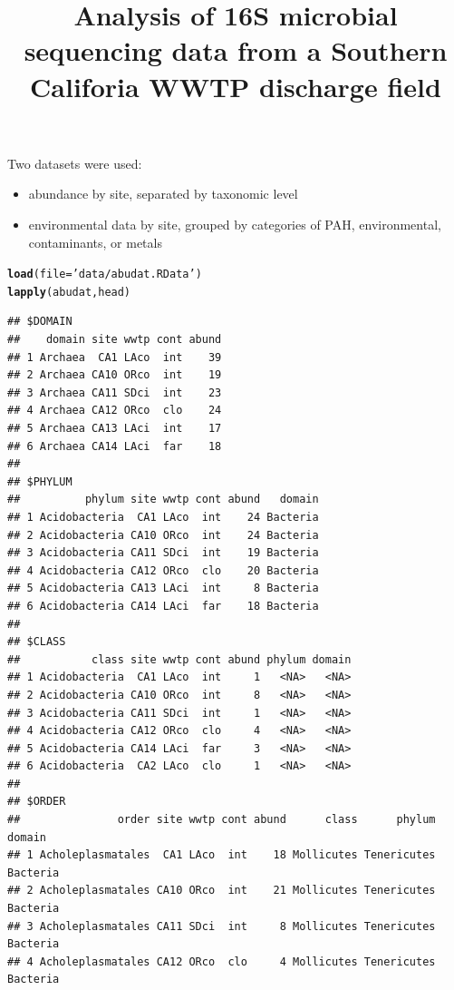 \documentclass[letterpaper,12pt]{article}\usepackage[]{graphicx}\usepackage[]{color}
\makeatletter
\newcommand{\hlstr}[1]{\textcolor[rgb]{0.192,0.494,0.8}{#1}}%
\newcommand{\hlstd}[1]{\textcolor[rgb]{0.345,0.345,0.345}{#1}}%
\newcommand{\hlkwc}[1]{\textcolor[rgb]{0.333,0.667,0.333}{#1}}%
\newcommand{\hlkwd}[1]{\textcolor[rgb]{0.737,0.353,0.396}{\textbf{#1}}}%
\newenvironment{kframe}{%
 \def\at@end@of@kframe{}%
 \ifinner\ifhmode%
  \def\at@end@of@kframe{\end{minipage}}%
  \begin{minipage}{\columnwidth}%
 \fi\fi%
 \def\FrameCommand##1{\hskip\@totalleftmargin \hskip-\fboxsep
 \colorbox{shadecolor}{##1}\hskip-\fboxsep
     \hskip-\linewidth \hskip-\@totalleftmargin \hskip\columnwidth}%
 \MakeFramed {\advance\hsize-\width
   \@totalleftmargin\z@ \linewidth\hsize
   \@setminipage}}%
 {\par\unskip\endMakeFramed%
 \at@end@of@kframe}
\newenvironment{knitrout}{}{} %
\makeatother
\begin{document}
\title{Analysis of 16S microbial sequencing data from a Southern Califoria WWTP discharge field}
\maketitle

Two datasets were used:

\begin{itemize}
\item abundance by site, separated by taxonomic level
\item environmental data by site, grouped by categories of PAH, environmental, contaminants, or metals
\end{itemize}

\begin{knitrout}
\color{fgcolor}\begin{kframe}
\begin{alltt}
\hlkwd{load}\hlstd{(}\hlkwc{file} \hlstd{=} \hlstr{'data/abudat.RData'}\hlstd{)}
\hlkwd{lapply}\hlstd{(abudat, head)}
\end{alltt}
\begin{verbatim}
## $DOMAIN
##    domain site wwtp cont abund
## 1 Archaea  CA1 LAco  int    39
## 2 Archaea CA10 ORco  int    19
## 3 Archaea CA11 SDci  int    23
## 4 Archaea CA12 ORco  clo    24
## 5 Archaea CA13 LAci  int    17
## 6 Archaea CA14 LAci  far    18
## 
## $PHYLUM
##          phylum site wwtp cont abund   domain
## 1 Acidobacteria  CA1 LAco  int    24 Bacteria
## 2 Acidobacteria CA10 ORco  int    24 Bacteria
## 3 Acidobacteria CA11 SDci  int    19 Bacteria
## 4 Acidobacteria CA12 ORco  clo    20 Bacteria
## 5 Acidobacteria CA13 LAci  int     8 Bacteria
## 6 Acidobacteria CA14 LAci  far    18 Bacteria
## 
## $CLASS
##           class site wwtp cont abund phylum domain
## 1 Acidobacteria  CA1 LAco  int     1   <NA>   <NA>
## 2 Acidobacteria CA10 ORco  int     8   <NA>   <NA>
## 3 Acidobacteria CA11 SDci  int     1   <NA>   <NA>
## 4 Acidobacteria CA12 ORco  clo     4   <NA>   <NA>
## 5 Acidobacteria CA14 LAci  far     3   <NA>   <NA>
## 6 Acidobacteria  CA2 LAco  clo     1   <NA>   <NA>
## 
## $ORDER
##               order site wwtp cont abund      class      phylum   domain
## 1 Acholeplasmatales  CA1 LAco  int    18 Mollicutes Tenericutes Bacteria
## 2 Acholeplasmatales CA10 ORco  int    21 Mollicutes Tenericutes Bacteria
## 3 Acholeplasmatales CA11 SDci  int     8 Mollicutes Tenericutes Bacteria
## 4 Acholeplasmatales CA12 ORco  clo     4 Mollicutes Tenericutes Bacteria

\end{verbatim}
\end{kframe}
\end{knitrout}
\end{document}
